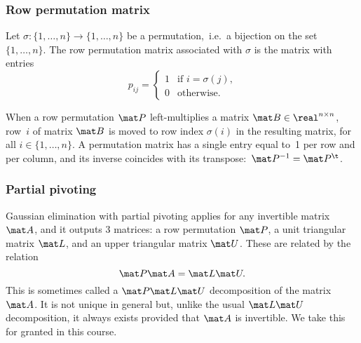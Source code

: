 \subsubsection*{Row permutation matrix}%
\begin{definition}
    \label{definition:row_permutation_matrix}%
    Let $\sigma : \{1, \dotsc, n\} \to \{1, \dotsc, n\}$ be a permutation,\
    i.e.\ a bijection on the set~$\{1, \dotsc, n\}$.
    The row permutation matrix associated with $\sigma$ is the matrix with entries
    \[
        p_{ij} =
        \begin{cases}
            1 & \text{if $i = \sigma(j)$,} \\
            0 & \text{otherwise.}
        \end{cases}
    \]
\end{definition}
When a row permutation $\mat P$ left-multiplies a matrix $\mat B \in \real^{n \times n}$,
row~$i$ of matrix $\mat B$ is moved to row index $\sigma(i)$ in the resulting matrix,
for all $i \in \{1, \dots, n\}$.
A permutation matrix has a single entry equal to~1 per row and per column,
and its inverse coincides with its transpose:~$\mat P^{-1} = \mat P^\t$.

\subsubsection*{Partial pivoting}%
Gaussian elimination with partial pivoting applies for any invertible matrix $\mat A$,
and it outputs 3 matrices: a row permutation $\mat P$, a unit triangular matrix $\mat L$,
and an upper triangular matrix $\mat U$.
These are related by the relation
\[
    \mat P \mat A = \mat L \mat U.
\]
This is sometimes called a $\mat P \mat L \mat U$ decomposition of the matrix $\mat A$.
It is not unique in general but, unlike the usual $\mat L \mat U$ decomposition,
it always exists provided that $\mat A$ is invertible.
We take this for granted in this course.

